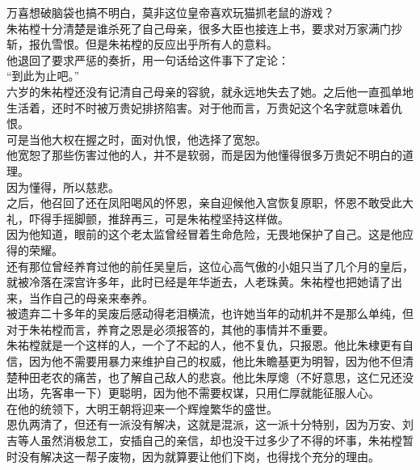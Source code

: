 \begin{multicols}{\theparacolNo}
万喜想破脑袋也搞不明白，莫非这位皇帝喜欢玩猫抓老鼠的游戏？\\

朱祐樘十分清楚是谁杀死了自己母亲，很多大臣也接连上书，要求对万家满门抄斩，报仇雪恨。但是朱祐樘的反应出乎所有人的意料。\\

他退回了要求严惩的奏折，用一句话给这件事下了定论：\\

“到此为止吧。”\\

六岁的朱祐樘还没有记清自己母亲的容貌，就永远地失去了她。之后他一直孤单地生活着，还时不时被万贵妃排挤陷害。对于他而言，万贵妃这个名字就意味着仇恨。\\

可是当他大权在握之时，面对仇恨，他选择了宽恕。\\

他宽恕了那些伤害过他的人，并不是软弱，而是因为他懂得很多万贵妃不明白的道理。\\

因为懂得，所以慈悲。\\

之后，他召回了还在凤阳喝风的怀恩，亲自迎候他入宫恢复原职，怀恩不敢受此大礼，吓得手摇脚颤，推辞再三，可是朱祐樘坚持这样做。\\

因为他知道，眼前的这个老太监曾经冒着生命危险，无畏地保护了自己。这是他应得的荣耀。\\

还有那位曾经养育过他的前任吴皇后，这位心高气傲的小姐只当了几个月的皇后，就被冷落在深宫许多年，此时已经是年华逝去，人老珠黄。朱祐樘也把她请了出来，当作自己的母亲来奉养。\\

被遗弃二十多年的吴废后感动得老泪横流，也许她当年的动机并不是那么单纯，但对于朱祐樘而言，养育之恩是必须报答的，其他的事情并不重要。\\

朱祐樘就是一个这样的人，一个了不起的人，他不复仇，只报恩。他比朱棣更有自信，因为他不需要用暴力来维护自己的权威，他比朱瞻基更为明智，因为他不但清楚种田老农的痛苦，也了解自己敌人的悲哀。他比朱厚熜（不好意思，这仁兄还没出场，先客串一下）更聪明，因为他不需要权谋，只用仁厚就能征服人心。\\

在他的统领下，大明王朝将迎来一个辉煌繁华的盛世。\\

恩仇两清了，但还有一派没有解决，这就是混派，这一派十分特别，因为万安、刘吉等人虽然消极怠工，安插自己的亲信，却也没干过多少了不得的坏事，朱祐樘暂时没有解决这一帮子废物，因为就算要让他们下岗，也得找个充分的理由。\\


\end{multicols}
